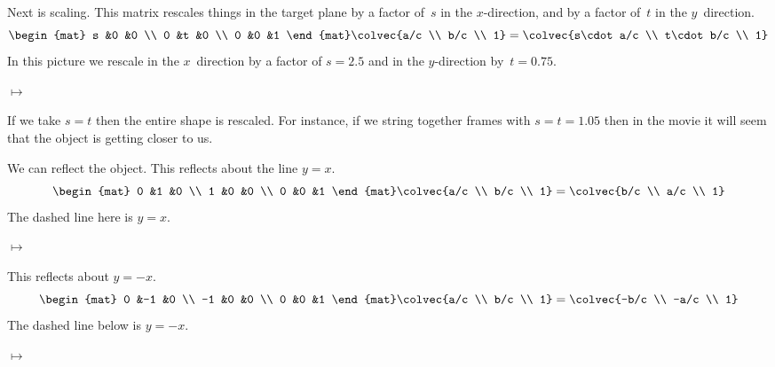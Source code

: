 Next is scaling.
This matrix rescales things in the target plane 
by a factor of~$s$  in the $x$-direction, 
and  by a factor of~$t$ in the $y$~direction.
\begin{equation*}
  \begin{mat}
    s  &0  &0  \\
    0  &t  &0  \\
    0  &0  &1  
  \end{mat}
  \colvec{a/c \\ b/c \\ 1}
  =
  \colvec{s\cdot a/c  \\  
          t\cdot b/c \\ 
          1}
\end{equation*}
In this picture we rescale in the $x$~direction by a factor of $s=2.5$
and in the $y$-direction by~$t=0.75$.
\begin{center} 
  \quad$\mapsto$\quad
\end{center}

If we take $s=t$ then the entire shape is rescaled.
For instance, if we string together frames with $s=t=1.05$ then in
the movie it will seem that the object is getting closer to us.

We can reflect the object.
This reflects about the line $y=x$.
\begin{equation*}
  \begin{mat}
    0  &1  &0  \\
    1  &0  &0  \\
    0  &0  &1  
  \end{mat}
  \colvec{a/c \\ b/c \\ 1}
  =
  \colvec{b/c  \\  
          a/c \\ 
          1}
\end{equation*}
The dashed line here is $y=x$.
\begin{center} 
  \quad$\mapsto$\quad
\end{center}

This reflects about $y=-x$.
\begin{equation*}
  \begin{mat}
    0   &-1  &0  \\
    -1  &0  &0  \\
    0   &0  &1  
  \end{mat}
  \colvec{a/c \\ b/c \\ 1}
  =
  \colvec{-b/c  \\  
          -a/c \\ 
          1}
\end{equation*}
The dashed line below is $y=-x$.
\begin{center} 
  \quad$\mapsto$\quad
\end{center}

